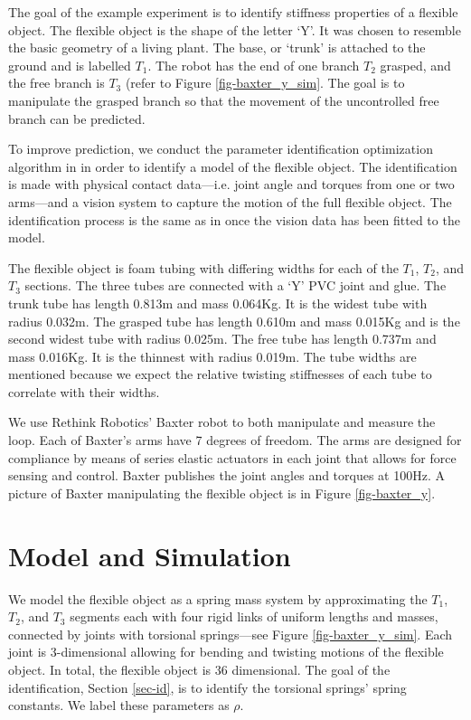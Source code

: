 \documentclass[runningheads,a4paper]{llncs}
\begin{document}
The goal of the example experiment is to identify stiffness properties of a flexible object. The flexible object is the shape of the letter `Y'.  It was chosen to resemble the basic geometry of a living plant. The base, or `trunk' is attached to the ground and is labelled $T_1$. The robot has the end of one branch $T_2$ grasped, and the free branch is $T_3$ (refer to Figure \ref{fig-baxter_y_sim}.  The goal is to manipulate the grasped branch so that the movement of the uncontrolled free branch can be predicted. %

To improve prediction, we conduct the parameter identification optimization algorithm in \cite{caldwell_coleman_correll_iros} in order to identify a model of the flexible object. The identification is made with physical contact data---i.e. joint angle and torques from one or two arms---and a vision system to capture the motion of the full flexible object. The identification process is the same as in \cite{caldwell_coleman_correll_iros} once the vision data has been fitted to the model. %

The flexible object is foam tubing with differing widths for each of the $T_1$, $T_2$, and $T_3$ sections. The three tubes are connected with a `Y' PVC joint and glue.  The trunk tube has length 0.813m and mass 0.064Kg. It is the widest tube with radius 0.032m. The grasped tube has length 0.610m and mass 0.015Kg and is the second widest tube with radius 0.025m. The free tube has length 0.737m and mass 0.016Kg. It is the thinnest with radius 0.019m.  The tube widths are mentioned because we expect the relative twisting stiffnesses of each tube to correlate with their widths. 

We use Rethink Robotics' Baxter \cite{guizzo2011rethink} robot to both manipulate and measure the loop.  Each of Baxter's arms have 7 degrees of freedom.  The arms are designed for compliance by means of series elastic actuators in each joint that allows for force sensing and control.  Baxter publishes the joint angles and torques at 100Hz.  A picture of Baxter manipulating the flexible object is in Figure \ref{fig-baxter_y}. 

\section{Model and Simulation \label{sec-sim}}
\label{sec-sim}
We model the flexible object as a spring mass system by approximating the $T_1$, $T_2$, and $T_3$ segments each with four rigid links of uniform lengths and masses, connected by joints with torsional springs---see Figure \ref{fig-baxter_y_sim}. Each joint is 3-dimensional allowing for bending and twisting motions of the flexible object. In total, the flexible object is 36 dimensional. The goal of the identification, Section \ref{sec-id}, is to identify the torsional springs' spring constants. We label these parameters as $\rho$.
\end{document}
